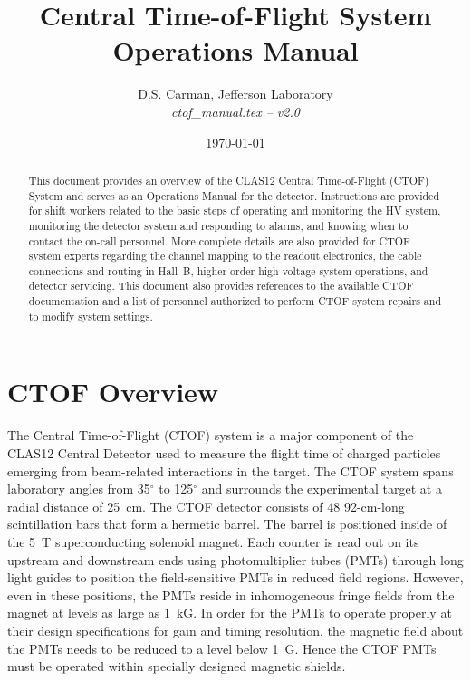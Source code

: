 \documentclass[12pt]{article}
\begin{document}
\title{Central Time-of-Flight System Operations Manual}

\vskip 0.5cm

\author{D.S. Carman, Jefferson Laboratory\\[0.2ex]
{\it ctof\_manual.tex -- v2.0}}

\date \today
%
\maketitle

\begin{abstract}
  This document provides an overview of the CLAS12 Central Time-of-Flight (CTOF) System and serves
  as an Operations Manual for the detector. Instructions are provided for shift workers related to the
  basic steps of operating and monitoring the HV system, monitoring the detector system and responding
  to alarms, and knowing when to contact the on-call personnel. More complete details are also provided
  for CTOF system experts regarding the channel mapping to the readout electronics, the cable
  connections and routing in Hall~B, higher-order high voltage system operations, and detector servicing.
  This document also provides references to the available CTOF documentation and a list of personnel
  authorized to perform CTOF system repairs and to modify system settings.
\end{abstract}

\thispagestyle{empty}

\clearpage

\vfil
\eject

\tableofcontents

\vfil
\eject

\section{CTOF Overview}
\label{intro}

The Central Time-of-Flight (CTOF) system is a major component of the CLAS12 Central Detector used to
measure the flight time of charged particles emerging from beam-related interactions in the target. The
CTOF system spans laboratory angles from 35$^\circ$ to 125$^\circ$ and surrounds the experimental
target at a radial distance of 25~cm. The CTOF detector consists of 48 92-cm-long scintillation bars that
form a hermetic barrel. The barrel is positioned inside of the 5~T superconducting solenoid magnet. Each
counter is read out on its upstream and downstream ends using photomultiplier tubes (PMTs) through long
light guides to position the field-sensitive PMTs in reduced field regions. However, even in these positions,
the PMTs reside in inhomogeneous fringe fields from the magnet at levels as large as 1~kG. In order for
the PMTs to operate properly at their design specifications for gain and timing resolution, the magnetic
field about the PMTs needs to be reduced to a level below 1~G. Hence the CTOF PMTs must be operated 
within specially designed magnetic shields.
\end{document}

